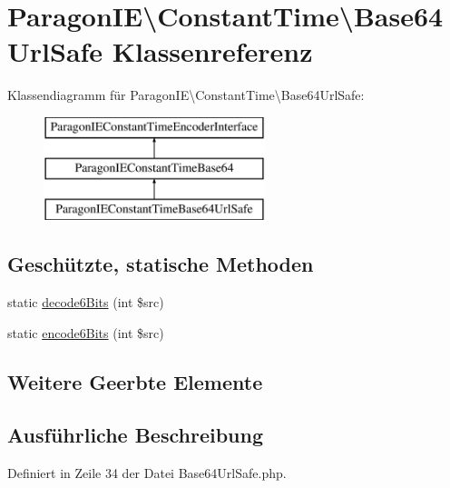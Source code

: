 \hypertarget{class_paragon_i_e_1_1_constant_time_1_1_base64_url_safe}{}\section{Paragon\+IE\textbackslash{}Constant\+Time\textbackslash{}Base64\+Url\+Safe Klassenreferenz}
\label{class_paragon_i_e_1_1_constant_time_1_1_base64_url_safe}
Klassendiagramm für Paragon\+IE\textbackslash{}Constant\+Time\textbackslash{}Base64\+Url\+Safe\+:\begin{figure}[H]
\begin{center}
\leavevmode
\includegraphics[height=3.000000cm]{class_paragon_i_e_1_1_constant_time_1_1_base64_url_safe}
\end{center}
\end{figure}
\subsection*{Geschützte, statische Methoden}
\begin{DoxyCompactItemize}
\item 
static \mbox{\hyperlink{class_paragon_i_e_1_1_constant_time_1_1_base64_url_safe_a17f3f8ae0a5bf506dca0acea77c59d7f}{decode6\+Bits}} (int \$src)
\item 
static \mbox{\hyperlink{class_paragon_i_e_1_1_constant_time_1_1_base64_url_safe_ab0ad394993239ece8774597fb08dcbf6}{encode6\+Bits}} (int \$src)
\end{DoxyCompactItemize}
\subsection*{Weitere Geerbte Elemente}


\subsection{Ausführliche Beschreibung}


Definiert in Zeile 34 der Datei Base64\+Url\+Safe.\+php.



